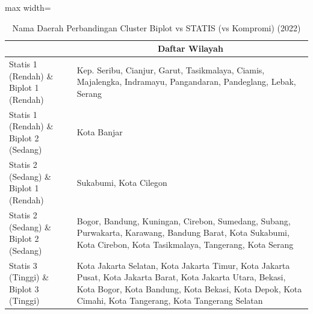 \begin{table}[H]
\centering
\caption{Nama Daerah Perbandingan Cluster Biplot vs STATIS (vs Kompromi) (2022)} \label{tab:app1biplot_statis_name_2022}
\begin{adjustbox}{max width=\textwidth}
\begin{tabular}{|>{\centering\arraybackslash}p{4cm}|p{10cm}|}
\hline
\multicolumn{1}{|c|}{\textbf{Kategori}} & \multicolumn{1}{c|}{\textbf{Daftar Wilayah}} \\
\hline
Statis 1 (Rendah) \& Biplot 1 (Rendah) & Kep. Seribu, Cianjur, Garut, Tasikmalaya, Ciamis, Majalengka, Indramayu, Pangandaran, Pandeglang, Lebak, Serang \\
\hline
Statis 1 (Rendah) \& Biplot 2 (Sedang) & Kota Banjar \\
\hline
Statis 2 (Sedang) \& Biplot 1 (Rendah) & Sukabumi, Kota Cilegon \\
\hline
Statis 2 (Sedang) \& Biplot 2 (Sedang) & Bogor, Bandung, Kuningan, Cirebon, Sumedang, Subang, Purwakarta, Karawang, Bandung Barat, Kota Sukabumi, Kota Cirebon, Kota Tasikmalaya, Tangerang, Kota Serang \\
\hline
Statis 3 (Tinggi) \& Biplot 3 (Tinggi) & Kota Jakarta Selatan, Kota Jakarta Timur, Kota Jakarta Pusat, Kota Jakarta Barat, Kota Jakarta Utara, Bekasi, Kota Bogor, Kota Bandung, Kota Bekasi, Kota Depok, Kota Cimahi, Kota Tangerang, Kota Tangerang Selatan \\
\hline
\end{tabular}
\end{adjustbox}
\end{table}
